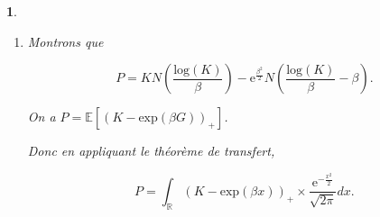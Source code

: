 \documentclass{article}
\theoremstyle{exostyle}
\newtheorem{exercice}{}
\newenvironment{questions}{
\begin{enumerate}[\hspace{12pt} 1.]}{\end{enumerate}}
\begin{document}
\begin{exercice}
\begin{questions}
On s'intéresse à présent au calcul de $I_{2}$.
En utilisant une identité remarquable de type $(a-b)^{2}$, on a :

\[I_{2} = \int_{\frac{\text{ln}(K)}{\beta}}^{+\infty} \frac{1}{\sqrt{2\pi}}\text{exp}\left(-\frac{1}{2}(x-\beta)^{2}+\frac{\beta^{2}}{2} \right)dx.\]

On fait un changement de variable : on pose $y = x-\beta$, donc $dy=dx$.\\
\\
Donc, 

\begin{align*}
    I_{2} &= \int_{\frac{\text{ln}(K)}{\beta}-\beta}^{+\infty} \frac{1}{\sqrt{2\pi}}\text{exp}\left( -\frac{1}{2}y^{2}\right) \text{exp}\left( \frac{\beta^{2}}{2}\right)dy\\
    &= \text{exp}\left( \frac{\beta^{2}}{2}\right) \underbrace{\int_{\frac{\text{ln}(K)}{\beta}-\beta}^{+\infty} \frac{1}{\sqrt{2\pi}}\text{exp}\left( -\frac{1}{2}y^{2}\right)dy}_{= \mathbb{P}\left(G \geq \frac{\text{ln}(K)}{\beta} - \beta \right)}\\
    &= \text{exp}\left( \frac{\beta^{2}}{2}\right) \left( 1 - \mathbb{P}\left(G \leq \frac{\text{ln}(K)}{\beta} - \beta \right)\right)\\
    &= \text{exp}\left( \frac{\beta^{2}}{2}\right) \left( 1-N\left( \frac{\text{ln}(K)}{\beta} - \beta \right) \right)\\
    \leftbrace{\text{D'après (1)} \rightarrow} &= \text{exp}\left( \frac{\beta^{2}}{2}\right) N\left( \beta - \frac{\text{ln}(K)}{\beta} \right).
\end{align*}

Finalement, on a : 

\hspace{3.4cm}

\bigbreak
\bigbreak


\item Montrons que

\[P = KN\left( \frac{\text{log}(K)}{\beta}\right) - \text{e}^{\frac{\beta^{2}}{2}}N\left( \frac{\text{log}(K)}{\beta} - \beta\right).\]

On a $P = \mathbb{E}[(K-\text{exp}(\beta G))_{+}]$.

Donc en appliquant le théorème de transfert,

\[P = \int_{\mathbb{R}} (K-\text{exp}(\beta x))_{+} \times \frac{\text{e}^{-\frac{x^{2}}{2}}}{\sqrt{2\pi}}dx.\]



\end{questions}
\end{exercice}
\end{document}
